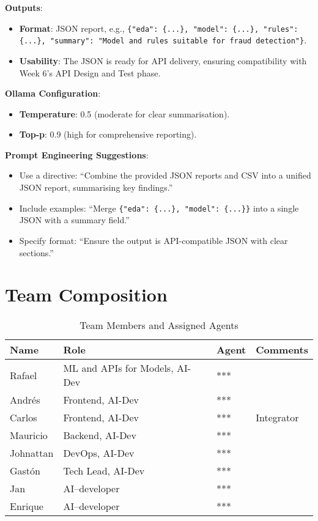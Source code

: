 \documentclass{article}
\begin{document}
\textbf{Outputs}:
\begin{itemize}[label=--]
    \item \textbf{Format}: JSON report, e.g., \texttt{\{"eda": \{...\}, "model": \{...\}, "rules": \{...\}, "summary": "Model and rules suitable for fraud detection"\}}.
    \item \textbf{Usability}: The JSON is ready for API delivery, ensuring compatibility with Week 6’s API Design and Test phase.
\end{itemize}

\textbf{Ollama Configuration}:
\begin{itemize}[label=--]
    \item \textbf{Temperature}: 0.5 (moderate for clear summarisation).
    \item \textbf{Top-p}: 0.9 (high for comprehensive reporting).
\end{itemize}

\textbf{Prompt Engineering Suggestions}:
\begin{itemize}[label=--]
    \item Use a directive: “Combine the provided JSON reports and CSV into a unified JSON report, summarising key findings.”
    \item Include examples: “Merge \texttt{\{"eda": \{...\}, "model": \{...\}\}} into a single JSON with a summary field.”
    \item Specify format: “Ensure the output is API-compatible JSON with clear sections.”
\end{itemize}

\section{Team Composition}

\begin{table}[h]
\centering
\begin{tabular}{|>{\raggedright\arraybackslash}p{}|>{\raggedright\arraybackslash}p{}|>{\raggedright\arraybackslash}p{}|>{\raggedright\arraybackslash}p{}|}
\hline
\textbf{Name} & \textbf{Role} & \textbf{Agent} & \textbf{Comments} \\ \hline
Rafael & ML and APIs for Models, AI-Dev & *** &  \\ \hline
Andrés & Frontend, AI-Dev & *** &  \\ \hline
Carlos & Frontend, AI-Dev & *** & Integrator \\ \hline
Mauricio & Backend, AI-Dev & *** &  \\ \hline
Johnattan & DevOps, AI-Dev & *** &  \\ \hline
Gastón & Tech Lead, AI-Dev & *** &  \\ \hline
Jan & AI--developer & *** &  \\ \hline
Enrique & AI--developer & *** &  \\ \hline
\end{tabular}
\caption{Team Members and Assigned Agents}
\end{table}
\end{document}
